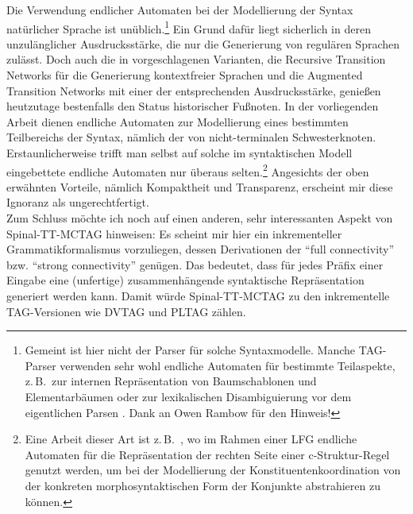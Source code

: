Die Verwendung endlicher Automaten bei der Modellierung der Syntax natürlicher Sprache ist unüblich.\footnote{Gemeint ist hier nicht der Parser für solche Syntaxmodelle. Manche TAG-Parser verwenden sehr wohl endliche Automaten für bestimmte Teilaspekte, z.\,B.\ zur internen Repräsentation von Baumschablonen und Elementarbäumen \citep{Nasr:Rambow:04} oder zur lexikalischen Disambiguierung vor dem eigentlichen Parsen \citep{Gardent:etal:14}. Dank an Owen Rambow für den Hinweis!} Ein Grund dafür liegt sicherlich in deren unzulänglicher Ausdrucksstärke, die nur die Generierung von regulären Sprachen zulässt. Doch auch die in \cite{Woods:70} vorgeschlagenen Varianten, die Recursive Transition Networks für die Generierung kontextfreier Sprachen und die Augmented Transition Networks mit einer der  entsprechenden Ausdrucksstärke, genie\ss en heutzutage bestenfalls den Status historischer Fu\ss noten. In der vorliegenden Arbeit dienen endliche Automaten zur Modellierung eines bestimmten Teilbereichs der Syntax, nämlich der  von nicht-terminalen Schwesterknoten. Erstaunlicherweise trifft man selbst auf solche im syntaktischen Modell eingebettete endliche Automaten nur überaus selten.\footnote{Eine Arbeit dieser Art ist z.\,B.\ \cite{Maxwell:Manning:96}, wo im Rahmen einer LFG endliche Automaten für die Repräsentation der rechten Seite einer c-Struktur-Regel genutzt werden, um bei der Modellierung der Konstituentenkoordination von der konkreten morphosyntaktischen Form der Konjunkte abstrahieren zu können.} Angesichts der oben erwähnten Vorteile, nämlich Kompaktheit und Transparenz, erscheint mir diese Ignoranz als ungerechtfertigt. \\

Zum Schluss möchte ich noch auf einen anderen, sehr interessanten Aspekt von Spinal-TT-MCTAG hinweisen: Es scheint mir hier ein inkrementeller Grammatikformalismus vorzuliegen, dessen Derivationen der "`full connectivity"' \citep{Sturt:Lombardo:05} bzw. "`strong connectivity"' \citep{Stabler:94} genügen. Das bedeutet, dass für jedes Präfix einer Eingabe eine (unfertige) zusammenhängende syntaktische Repräsentation generiert werden kann. Damit würde Spinal-TT-MCTAG zu den inkrementelle TAG-Versionen wie DVTAG \citep{Mazzei:etal:07} und PLTAG \citep{Demberg:Keller:08, Demberg:10} zählen. 



